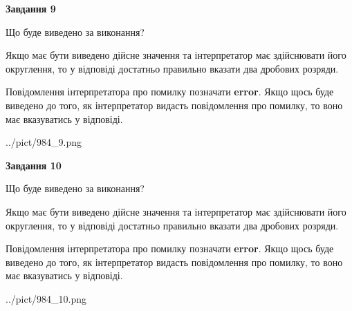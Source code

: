 \documentclass[12pt, ukrainian]{article}
\begin{document}
{\begin {Large}
{\begin {center}\textbf{Завдання 9}\end {center}}\par
Що буде виведено за виконання? \par

Якщо має бути виведено дійсне значення та інтерпретатор має здійснювати його округлення, 
то у відповіді достатньо правильно вказати два дробових розряди.

Повідомлення інтерпретатора про помилку позначати \textbf{error}.
Якщо щось буде виведено до того, як інтерпретатор видасть повідомлення про помилку, 
то воно має вказуватись у відповіді. \par

\begin{center}
	{../pict/984_9.png}
\end{center}
\newpage

{\begin {center}\textbf{Завдання 10}\end {center}}\par
Що буде виведено за виконання? \par

Якщо має бути виведено дійсне значення та інтерпретатор має здійснювати його округлення, 
то у відповіді достатньо правильно вказати два дробових розряди.

Повідомлення інтерпретатора про помилку позначати \textbf{error}.
Якщо щось буде виведено до того, як інтерпретатор видасть повідомлення про помилку, 
то воно має вказуватись у відповіді. \par

\begin{center}
	{../pict/984_10.png}
\end{center}
\newpage

\end {Large}}
\end{document}
